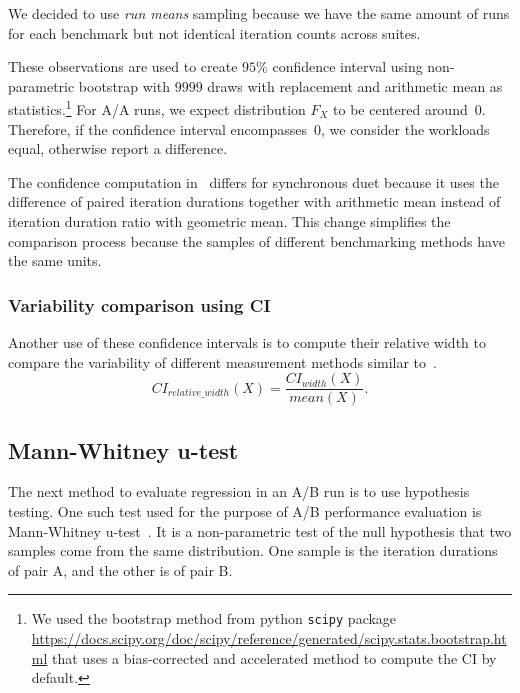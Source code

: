 We decided to use \emph{run means} sampling because we have the same amount of runs for each benchmark but not identical iteration counts across suites.

These observations are used to create $95\%$ confidence interval using non-parametric bootstrap with $9999$ draws with replacement and arithmetic mean as statistics.\footnote{We used the bootstrap method from python \lstinline{scipy} package \url{https://docs.scipy.org/doc/scipy/reference/generated/scipy.stats.bootstrap.html} that uses a \mbox{bias-corrected} and accelerated method to compute the CI by default.}
For A/A runs, we expect distribution $F_X$ to be centered around~$0$.
Therefore, if the confidence interval encompasses~$0$, we consider the workloads equal, otherwise report a difference.

The confidence computation in~\citet{bulej2020duet} differs for synchronous duet because it uses the difference of paired iteration durations together with arithmetic mean instead of iteration duration ratio with geometric mean.
This change simplifies the comparison process because the samples of different benchmarking methods have the same units.
 
\subsubsection{Variability comparison using CI}
\label{sec:ci_width}

Another use of these confidence intervals is to compute their relative width to compare the variability of different measurement methods similar to~\citet{bulej2020duet}.
\begin{equation}\label{eq:relative_ci_width} 
CI_{relative\_width}(X) = \frac{CI_{width}(X)}{mean(X)}.
\end{equation}

\subsection{Mann-Whitney u-test}
\label{sec:utest}

The next method to evaluate regression in an A/B run is to use hypothesis testing.
One such test used for the purpose of A/B performance evaluation is Mann-Whitney \mbox{u-test}~\cite{bulej2017stat,laaber2019software}.
It is a non-parametric test of the null hypothesis that two samples come from the same distribution.
One sample is the iteration durations of pair A, and the other is of pair B.

